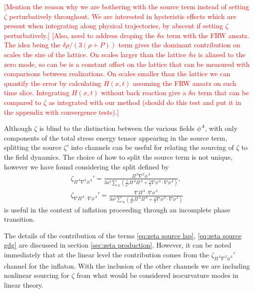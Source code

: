 \textcolor{red}{[Mention the reason why we are bothering with the source term instead of setting $\zeta$ perturbatively throughout. We are interested in hysteristis effects which are present when integrating along physical trajectories, by abscent if setting $\zeta$ perturbatively.]}
\textcolor{red}{[Also, need to address droping the $\delta\alpha$ term with the FRW ansatz. The idea being the $\delta\rho/(3(\rho+P))$ term gives the dominant contribution on scales the size of the lattice. On scales larger than the lattice $\delta\alpha$ is aliased to the zero mode, so can be is a constant offset on the lattice that can be measured with comparisons between realizations. On scales smaller than the lattice we can quantify the error by calculating $H(x,t)$ assuming the FRW ansatz on each time slice. Integrating $H(x,t)$ without back reaction give a $\delta\alpha$ term that can be compared to $\zeta$ as integrated with our method (should do this test and put it in the appendix with convergence tests).]}

Although $\zeta$ is blind to the distinction between the various fields $\phi^A$, with only components of the total stress energy tensor appearing in the source term, splitting the source $\zeta'$ into channels can be useful for relating the sourcing of $\zeta$ to the field dynamics. The choice of how to split the source term is not unique, however we have found considering the split defined by
\begin{align}
  \zeta_{\Pi^A\nabla^2\phi^A}' = \frac{\Pi^A\nabla^2\phi^A}{3a^2\sum_A\left(\frac{1}{a^4}\Pi^A\Pi^A + \frac{1}{3}\nabla\phi^A\cdot\nabla\phi^A \right)}, \label{eq:zeta source lap}\\
  \zeta_{\nabla\Pi^A\cdot\nabla\phi^A}' = \frac{\nabla\Pi^A\cdot\nabla\phi^A}{3a^2\sum_A\left(\frac{1}{a^4}\Pi^A\Pi^A + \frac{1}{3}\nabla\phi^A\cdot\nabla\phi^A \right)} \label{eq:zeta source gdg}
\end{align}
is useful in the context of inflation proceeding through an incomplete phase transition.

The details of the contribution of the terms \eqref{eq:zeta source lap}, \eqref{eq:zeta source gdg} are discussed in section \ref{sec:zeta production}. However, it can be noted immediately that at the linear level the contribution comes from the $\zeta_{\Pi^A\nabla^2\phi^A}'$ channel for the inflaton. With the inclusion of the  other channels we are including nonlinear sourcing for $\zeta$ from what would be considered isocurvature modes in linear theory.

